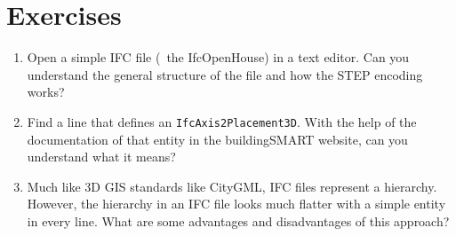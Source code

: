 %

\section{Exercises}

\begin{enumerate}

\item
Open a simple IFC file (\eg\ the IfcOpenHouse) in a text editor.
Can you understand the general structure of the file and how the STEP encoding works? 

\item
Find a line that defines an \texttt{IfcAxis2Placement3D}.
With the help of the documentation of that entity in the buildingSMART website, can you understand what it means?

\item
Much like 3D GIS standards like CityGML, IFC files represent a hierarchy.
However, the hierarchy in an IFC file looks much flatter with a simple entity in every line.
What are some advantages and disadvantages of this approach?

\end{enumerate}
